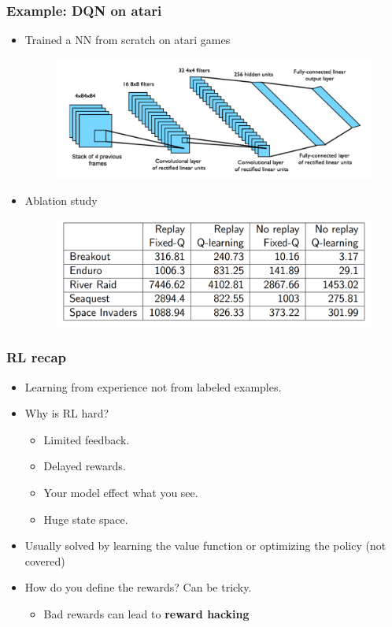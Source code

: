 \documentclass[handout]{beamer}
\renewcommand{\high}{\textbf}
\begin{document}
\begin{frame}\frametitle{Example: DQN on atari}\small

\begin{itemize}
	\item Trained a NN from scratch on atari games 

\begin{figure}
	\includegraphics[width=0.75\linewidth]{Figures/DQN_arc}
\end{figure}
\item Ablation study
\begin{figure}
	\includegraphics[width=0.75\linewidth]{Figures/ablation}
\end{figure}
\end{itemize}

\end{frame}


\begin{frame}\frametitle{RL recap}\small

\begin{itemize}
	\item Learning from experience not from labeled examples.
	\onslide<2->\item Why is RL hard?
	\begin{itemize}
		\item Limited feedback.
		\onslide<4->\item Delayed rewards.
		\onslide<5->\item Your model effect what you
		 see.
		\onslide<6->\item Huge state space.
	\end{itemize}
	 \item Usually solved by learning the value function or optimizing the policy (not covered)
	\onslide<9-> \item How do you define the rewards? Can be tricky.
	\begin{itemize}
		\item Bad rewards can lead to \high{reward hacking}
	\end{itemize}
	
\end{itemize}

\end{frame}
\end{document}

